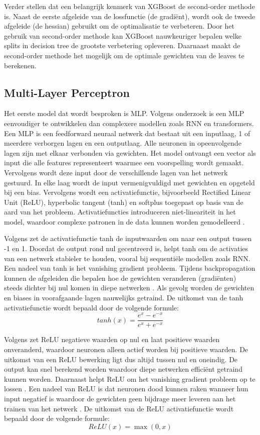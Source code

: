 Verder stellen \textcite{Chen2016} dat een belangrijk kenmerk van XGBoost de second-order methode is. Naast de eerste afgeleide van de lossfunctie (de gradiënt), wordt ook de tweede afgeleide (de hessian) gebruikt om de optimalisatie te verbeteren. Door het gebruik van second-order methode kan XGBoost nauwkeuriger bepalen welke splits in decision tree de grootste verbetering opleveren. Daarnaast maakt de second-order methode het mogelijk om de optimale gewichten van de leaves te berekenen.

\subsection{Multi-Layer Perceptron}
Het eerste model dat wordt besproken is MLP. Volgens onderzoek \autocite{Duan2025} is een MLP eenvoudiger te ontwikkelen dan complexere modellen zoals RNN en transformers. Een MLP is een feedforward neuraal netwerk dat bestaat uit een inputlaag, 1 of meerdere verborgen lagen en een outputlaag. Alle neuronen in opeenvolgende lagen zijn met elkaar verbonden via gewichten.
Het model ontvangt een vector als input die alle features representeert waarmee een voorspelling wordt gemaakt. Vervolgens wordt deze input door de verschillende lagen van het netwerk gestuurd. In elke laag wordt de input vermenigvuldigd met gewichten en opgeteld bij een bias. Vervolgens wordt een activatiefunctie, bijvoorbeeld Rectified Linear Unit (ReLU), hyperbolic tangent (tanh) en softplus toegepast op basis van de aard van het probleem. Activatiefuncties introduceren niet-lineariteit in het model, waardoor complexe patronen in de data kunnen worden gemodelleerd \autocite{Gustineli2022}.

Volgens \textcite{Jagtap2022} zet de activatiefunctie tanh de inputwaarden om naar een output tussen -1 en 1. Doordat de output rond nul gecentreerd is, helpt tanh om de activaties van een netwerk stabieler te houden, vooral bij sequentiële modellen zoals RNN. Een nadeel van tanh is het vanishing gradient probleem. Tijdens backpropagation kunnen de afgeleiden die bepalen hoe de gewichten veranderen (gradiënten) steeds dichter bij nul komen in diepe netwerken \autocite{Gustineli2022}. Als gevolg worden de gewichten en biases in voorafgaande lagen nauwelijks getraind. De uitkomst van de tanh activatiefunctie wordt bepaald door de volgende formule:
\[ tanh(x) = \frac{e^x - e^{-x}}{e^x + e^{-x}} \]

Volgens \textcite{Dubey2022} zet ReLU negatieve waarden op nul en laat positieve waarden onveranderd, waardoor neuronen alleen actief worden bij positieve waarden. De uitkomst van een ReLU bewerking ligt dus altijd tussen nul en oneindig. De output kan snel berekend worden waardoor diepe netwerken efficiënt getraind kunnen worden. Daarnaast helpt ReLU om het vanishing gradient probleem op te lossen \autocite{Ntambwe2025}. Een nadeel van ReLU is dat neuronen dood kunnen raken wanneer hun input negatief is waardoor de gewichten geen bijdrage meer leveren aan het trainen van het netwerk \autocite{Gustineli2022}. De uitkomst van de ReLU activatiefunctie wordt bepaald door de volgende formule:
\[ ReLU(x) = \max(0, x) \]


